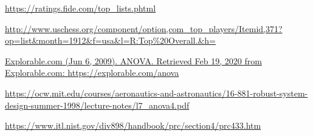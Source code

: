 \documentclass[12pt, titlepage]{article}
\begin{document}



\newpage
\begin{thebibliography}{thewidest}
\url{https://ratings.fide.com/top_lists.phtml}

  \url{http://www.uschess.org/component/option,com_top_players/Itemid,371?op=list&month=1912&f=usa&l=R:Top%20Overall.&h=}

\url{Explorable.com (Jun 6, 2009). ANOVA. Retrieved Feb 19, 2020 from Explorable.com: https://explorable.com/anova}

\url{https://ocw.mit.edu/courses/aeronautics-and-astronautics/16-881-robust-system-design-summer-1998/lecture-notes/l7_anova4.pdf}

\url{https://www.itl.nist.gov/div898/handbook/prc/section4/prc433.htm}
\end{thebibliography}
\end{document}
